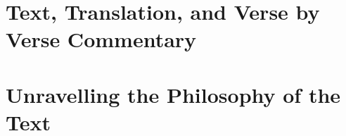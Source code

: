 \documentclass[10pt,twoside,openany]{book}
\begin{document}
\frontmatter

\lhead[\small\thepage]{}
\rhead[]{\small\thepage}
\chead[]{}
\cfoot[]{}


\newpage
 

\newpage


\newpage


\newpage


\newpage



\tableofcontents

\mainmatter

\part{Text, Translation, and Verse by Verse Commentary}





















\part{Unravelling the Philosophy of the Text}






\end{document}
